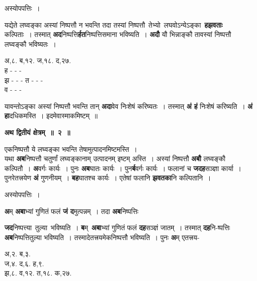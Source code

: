 \documentclass[11pt, openany]{book}
\begin{document}
\begin{center}
अस्योपपत्तिः~। 
\end{center}

\begin{flushleft}
\begin{minipage}[t]{0.62\textwidth}
\hspace{4mm} यद्येते लघ्वङ्का अस्यां निष्पत्तौ न भवन्ति तदा तस्यां निष्पत्तौ \,तेभ्यो \,लघवोऽन्येऽङ्का \,\textbf{हझवताः} \,कल्पिताः~। तस्मात् \textbf{अद}निष्पत्ति\textbf{र्हत}निष्पत्तिसमाना भविष्यति~। \textbf{अदौ} यौ भिन्नाङ्कौ तावस्यां निष्पत्तौ लघ्वङ्कौ भविष्यतः~।
\end{minipage} 
\hfill
\begin{minipage}[t]{0.3\textwidth}
अ,८. ब,१२. ज,१८. द,२७.\\
ह - - - \\
झ - - - त - - - \\
व - - - 
\end{minipage}
\end{flushleft}
\vspace{-3mm}

\noindent यावन्तोऽङ्का अस्यां निष्पत्तौ भवन्ति तान् \textbf{अदा}वेव निःशेषं करिष्यतः~। तस्मात् \textbf{अं हं} निःशेषं करिष्यति~। \textbf{अं हा}दधिकमस्ति~। इदमेवास्माकमिष्टम्~॥ 
\vspace{2mm}

\begin{center}
\textbf{\large अथ द्वितीयं क्षेत्रम्~॥~२~॥}
\end{center}

{\ab एकनिष्पत्तौ ये लघ्वङ्का भवन्ति तेषामुत्पादनमिष्टमस्ति~। }\\

 यथा \textbf{अब}निष्पत्तौ चतुर्णां लघ्वङ्कानाम् उत्पादनम् इष्टम् अस्ति~। अस्यां निष्पत्तौ \textbf{अबौ} लघ्वङ्कौ कल्पितौ~। \textbf{अ}वर्गः कार्यः~। पुनः \textbf{अब}घातः कार्यः~। पुन\textbf{र्ब}वर्गः कार्यः~। फलानां च \textbf{जदह}सञ्ज्ञा कार्या~। पुनरेतत्त्रयेण \textbf{अं} गुणनीयम्~। \textbf{बह}घातश्च कार्यः~। एतेषां फलानि \textbf{झवतका}नि कल्पितानि~। 

\begin{center}
अस्योपपत्तिः~।
\end{center}

 \textbf{अ}म् \textbf{अबा}भ्यां गुणितं फलं \textbf{जं द}मुत्पन्नम्~। तदा \textbf{अब}निष्पत्तिः

\newpage

\begin{flushleft}
\begin{minipage}[t]{0.55\textwidth}
\textbf{जद}निष्पत्त्या \,तुल्या \,भविष्यति~। \textbf{ब}म् \,\textbf{अबा}भ्यां गुणितं फलं \textbf{दह}सञ्ज्ञं जातम्~। तस्मात् \textbf{दह}नि-ष्पत्तिः \textbf{अब}निष्पत्तितुल्या भविष्यति~। तस्मादेतत्त्रयमेकनिष्पत्तौ भविष्यति~।  पुनः \textbf{अ}म् एतत्त्रय-
\end{minipage} 
\hfill
\begin{minipage}[t]{0.35\textwidth}
अ,२. ब,३.\\
ज,४. द,६. ह,९.\\
झ,८. व,१२. त,१८. क,२७.
\end{minipage}
\end{flushleft}
\vspace{-3mm}
\end{document}
